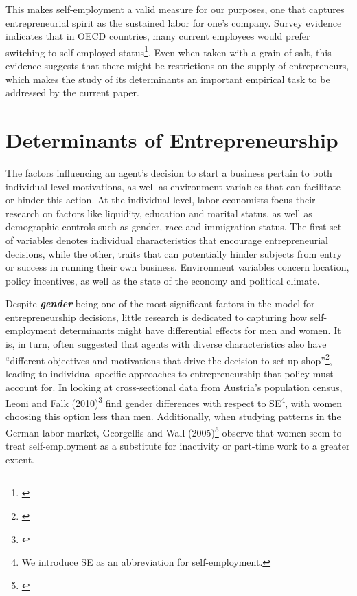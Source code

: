 This makes self-employment a valid measure for our purposes, one that captures entrepreneurial spirit as the sustained labor for one's company. Survey evidence indicates that in OECD countries, many current employees would prefer switching to self-employed status\footnote{\cite{BlanchflowerOswald1998}}. Even when taken with a grain of salt, this evidence suggests that there might be restrictions on the supply of entrepreneurs, which makes the study of its determinants an important empirical task to be addressed by the current paper. 


\section{Determinants of Entrepreneurship}

The factors influencing an agent's decision to start a business pertain to both individual-level motivations, as well as environment variables that can facilitate or hinder this action. At the individual level, labor economists focus their research on factors like liquidity, education and marital status, as well as demographic controls such as gender, race and immigration status. The first set of variables denotes individual characteristics that encourage entrepreneurial decisions, while the other, traits that can potentially hinder subjects from entry or success in running their own business. Environment variables concern location, policy incentives, as well as the state of the economy and political climate. 


Despite \textbf{\textit{gender}} being one of the most significant factors in the model for entrepreneurship decisions, little research is dedicated to capturing how self-employment determinants might have differential effects for men and women. It is, in turn, often suggested that agents with diverse characteristics also have ``different objectives and motivations that drive the decision to set up shop''\footnote{\cite{LeoniFalk2010}}, leading to individual-specific approaches to entrepreneurship that policy must account for. In looking at cross-sectional data from Austria's population census, Leoni and Falk (2010)\footnote{\cite{LeoniFalk2010}} find gender differences with respect to SE\footnote{ We introduce SE as an abbreviation for self-employment.}, with women choosing this option less than men. Additionally, when studying patterns in the German labor market, Georgellis and Wall (2005)\footnote{\cite{GeorgellisWall2005}} observe that women seem to treat self-employment as a substitute for inactivity or part-time work to a greater extent. 

